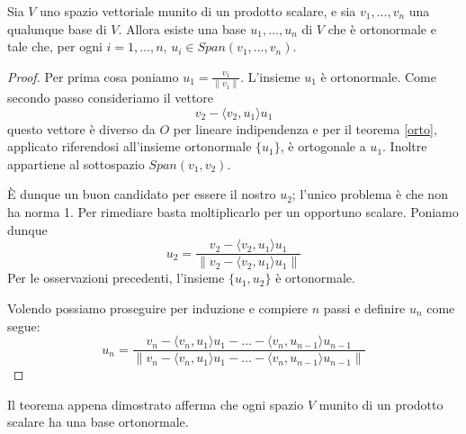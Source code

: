 \begin{theorem}
	Sia $V$ uno spazio vettoriale munito di un prodotto scalare, e sia
	$v_1, \dots, v_n$ una qualunque base di $V$. Allora esiste una base
	$u_1, \dots, u_n$ di $V$ che è ortonormale e tale che, per ogni
	$i = 1, \dots, n$, $u_i \in Span(v_1, \dots, v_n)$.
	\begin{proof}
		Per prima cosa poniamo $u_1 = \frac{v_1}{\| v_1 \|}$. L'insieme ${u_1}$ è ortonormale.
		Come secondo passo consideriamo il vettore
		\[
			v_2 - \langle v_2, u_1 \rangle u_1
		\]
		questo vettore è diverso da $O$ per lineare indipendenza e per il teorema \ref{orto},
		applicato riferendosi all'insieme ortonormale $\{ u_1 \}$, è ortogonale a $u_1$. Inoltre
		appartiene al sottospazio $Span(v_1, v_2)$.

		È dunque un buon candidato per essere il nostro $u_2$; l'unico problema è che non ha
		norma 1. Per rimediare basta moltiplicarlo per un opportuno scalare. Poniamo dunque
		\[
			u_2 = \frac{v_2 - \langle v_2, u_1 \rangle u_1}
			{\| v_2 - \langle v_2, u_1 \rangle u_1\|}
		\]
		Per le osservazioni precedenti, l'insieme $\{ u_1, u_2 \}$ è ortonormale.

		Volendo possiamo proseguire per induzione e compiere $n$ passi e definire $u_n$ come segue:
		\[
			u_n = \frac{v_n - \langle v_n, u_1 \rangle u_1 - \dots -
				\langle v_n, u_{n-1} \rangle u_{n-1}}
			{\| v_n - \langle v_n, u_1 \rangle u_1 - \dots - \langle v_n, u_{n-1} \rangle u_{n-1} \|}
		\]
	\end{proof}
\end{theorem}

Il teorema appena dimostrato afferma che ogni spazio $V$ munito di un prodotto
scalare ha una base ortonormale.

